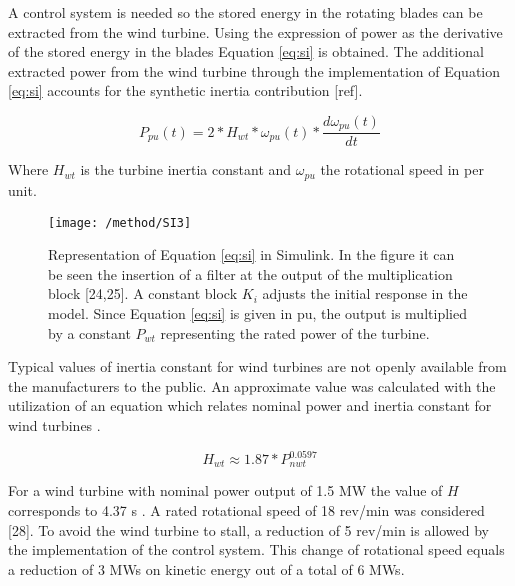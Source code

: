 	A control system is needed so the stored energy in the rotating blades can be extracted from the wind turbine. Using the expression of power as the derivative of the stored energy in the blades Equation \eqref{eq:si} is obtained. The additional extracted power from the wind turbine through the implementation of Equation \eqref{eq:si} accounts for the synthetic inertia contribution [ref].

\begin{equation}
	\label{eq:si}
	P_{pu}(t)=2*H_{wt}*\omega_{pu}(t)*\dfrac{d\omega_{pu}(t)}{dt}
\end{equation}


Where  $H_{wt}$ is the turbine inertia constant and $\omega_{pu}$ the rotational speed in per unit.\\

\begin{figure}[h]
	\centering
	\texttt{[image: /method/SI3]}
	\caption{Representation of Equation \eqref{eq:si} in Simulink. In the figure it can be seen the insertion of a filter at the output of the multiplication block [24,25]. A constant block $ K_i $ adjusts the initial response in the model. Since Equation \eqref{eq:si} is given in pu, the output is multiplied by a constant $ P_{wt} $ representing the rated power of the turbine.}
	\label{fig:synthetic}
\end{figure}

Typical values of inertia constant for wind turbines are not openly available from the manufacturers to the public. An approximate value was calculated with the utilization of an equation which relates nominal power and inertia constant for wind turbines \cite{GonzalezRodriguez.2007}.

\begin{equation}
	\label{eq:wtinertia}
	H_{wt}\approx1.87*P_{nwt}^{0.0597}
\end{equation}


For a wind turbine with nominal power output of 1.5 MW the value of $ H $ corresponds to 4.37 s \cite{Wu.2013}. A rated rotational speed of 18 rev/min was considered [28]. To avoid the wind turbine to stall, a reduction of 5 rev/min is allowed by the implementation of the control system. This change of rotational speed equals a reduction of 3 MWs on kinetic energy out of a total of 6 MWs.

